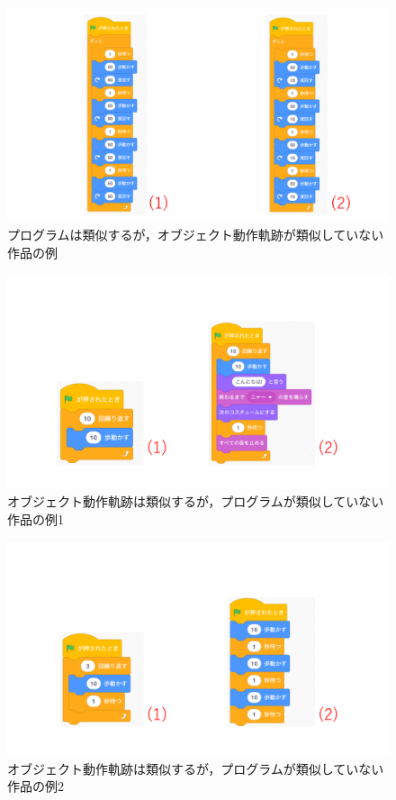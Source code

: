 \documentclass[T,J]{fose} %
\begin{document}
\begin{figure}[t]
	\centering
	\includegraphics[width=1.0\linewidth]{Okamoto_fig/pattern1.pdf}
	\caption{プログラムは類似するが，オブジェクト動作軌跡が類似していない作品の例}
	\label{fig:pattern1}
\end{figure}
\begin{figure}[t]
	\centering
	\includegraphics[width=1.0\linewidth]{Okamoto_fig/pattern2-1.pdf}
	\caption{オブジェクト動作軌跡は類似するが，プログラムが類似していない作品の例1}
	\label{fig:pattern2-1}
\end{figure}

\begin{figure}[t]
	\centering
	\includegraphics[width=1.0\linewidth]{Okamoto_fig/pattern2-2.pdf}
	\caption{オブジェクト動作軌跡は類似するが，プログラムが類似していない作品の例2}
	\label{fig:pattern2-2}
\end{figure}
\end{document}

